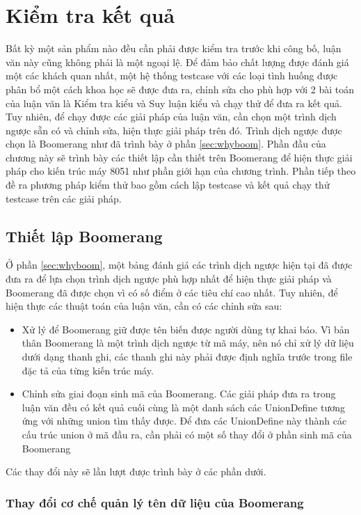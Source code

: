 \chapter{Kiểm tra kết quả}

Bất kỳ một sản phẩm nào đều cần phải được kiểm tra trước khi công bố, luận văn này cũng không phải là một ngoại lệ. Để đảm bảo chất lượng được đánh giá một các khách quan nhất, một hệ thống testcase với các loại tình huống được phân bổ một cách khoa học sẽ được đưa ra, chỉnh sửa cho phù hợp với 2 bài toán của luận văn là Kiểm tra kiểu và Suy luận kiểu và chạy thử để đưa ra kết quả. Tuy nhiên, để chạy được các giải pháp của luận văn, cần chọn một trình dịch ngược sẵn có và chỉnh sửa, hiện thực giải pháp trên đó. Trình dịch ngược được chọn là Boomerang như đã trình bày ở phần \ref{sec:whyboom}. Phần đầu của chương này sẽ trình bày các thiết lập cần thiết trên Boomerang để hiện thực giải pháp cho kiến trúc máy 8051 như phần giới hạn của chương trình. Phần tiếp theo đề ra phương pháp kiểm thử bao gồm cách lập testcase và kết quả chạy thử testcase trên các giải pháp.

\section{Thiết lập Boomerang}

\label{sec:boomchange}
Ở phần \ref{sec:whyboom}, một bảng đánh giá các trình dịch ngược hiện tại đã được đưa ra để lựa chọn trình dịch ngược phù hợp nhất để hiện thực giải pháp và Boomerang đã được chọn vì có số điểm ở các tiêu chí cao nhất. Tuy nhiên, để hiện thực các thuật toán của luận văn, cần có các chỉnh sửa sau:
\begin{itemize}
	\item Xử lý để Boomerang giữ được tên biến được người dùng tự khai báo. Vì bản thân Boomerang là một trình dịch ngược từ mã máy, nên nó chỉ xử lý dữ liệu dưới dạng thanh ghi, các thanh ghi này phải được định nghĩa trước trong file đặc tả của từng kiến trúc máy.
	\item Chỉnh sửa giai đoạn sinh mã của Boomerang. Các giải pháp đưa ra trong luận văn đều có kết quả cuối cùng là một danh sách các UnionDefine tương ứng với những union tìm thấy được. Để đưa các UnionDefine này thành các cấu trúc union ở mã đầu ra, cần phải có một số thay đổi ở phần sinh mã của Boomerang
\end{itemize}
Các thay đổi này sẽ	 lần lượt được trình bày ở các phần dưới.

\subsection{Thay đổi cơ chế quản lý tên dữ liệu của Boomerang}

